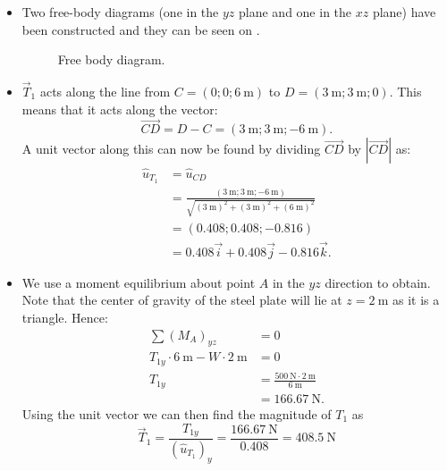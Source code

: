 \begin{derivation}
  \begin{itemize}
    \item[Q1.1] Two free-body diagrams (one in the $yz$ plane and one in the $xz$ plane) have been constructed and they can be seen on .

      \begin{figure}[ht]
        \centering
        \caption{Free body diagram.}
        \label{fig:e20251fbd}
      \end{figure}
    \item[Q1.2] $\Vec{T}_1$ acts along the line from $C = (0; 0; \qty{6}{\m})$ to $D = (\qty{3}{\m}; \qty{3}{\m}; 0)$. This means that it acts along the vector:
      \begin{equation*}
        \Vec{CD} = D - C = (\qty{3}{\m}; \qty{3}{\m}; \qty{-6}{\m})
      .\end{equation*}
      A unit vector along this can now be found by dividing $\Vec{CD}$ by $\left| \Vec{CD} \right|$ as:
      \begin{align*}
        \hat{u}_{T_1} &= \hat{u}_{CD} \\
        &= \frac{(\qty{3}{\m}; \qty{3}{\m}; \qty{-6}{\m})}{\sqrt{\left( \qty{3}{\m}  \right)^2 + \left( \qty{3}{\m}  \right)^2 + \left( \qty{6}{\m}  \right)^2}} \\
        &= \left( \num{0,408}; \num{0,408}; \num{-0,816}   \right) \\
        &= \num{0,408} \Vec{i} + \num{0,408} \Vec{j} - \num{0,816} \Vec{k}
      .\end{align*}
    \item[Q1.3] We use a moment equilibrium about point $A$ in the $yz$ direction to obtain. Note that the center of gravity of the steel plate will lie at $z = \qty{2}{\m} $ as it is a triangle.
      Hence:
      \begin{align*}
        \sum \left( M_A \right)_{yz} &= 0 \\
        T_{1y} \cdot \qty{6}{\m}  - W \cdot \qty{2}{\m} &= 0 \\
        T_{1y} &= \frac{\qty{500}{\N}  \cdot \qty{2}{\m} }{\qty{6}{\m} } \\
        &= \qty{166,67}{\N}
      .\end{align*}
      Using the unit vector we can then find the magnitude of $T_1$ as
      \begin{equation*}
        \Vec{T}_1 = \frac{T_{1y}}{(\hat{u}_{T_{1}})_y} = \frac{\qty{166.67}{\N}}{\num{0.408} } = \qty{408,5}{\N}

\end{equation*}
\end{itemize}
\end{derivation}
